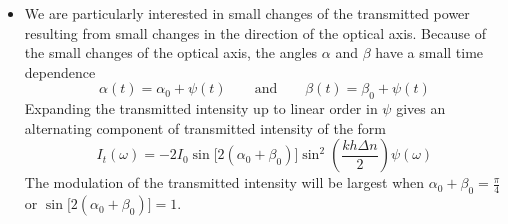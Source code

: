 \documentclass[11pt, a4paper]{article}
\newcommand{\eqtext}[1]{\qquad \text{#1} \qquad}
\begin{document}
\begin{itemize}
	\item We are particularly interested in small changes of the transmitted power resulting from small changes in the direction of the optical axis. Because of the small changes of the optical axis, the angles $ \alpha $ and $ \beta $ have a small time dependence
	\begin{equation*}
		\alpha(t) = \alpha_{0} + \psi(t) \eqtext{and} \beta(t) = \beta_{0} + \psi(t)
	\end{equation*}
	Expanding the transmitted intensity up to linear order in $ \psi $ gives an alternating component of transmitted intensity of the form
	\begin{equation*}
		I_{t}(\omega) = -2 I_{0} \sin\big[2(\alpha_{0} + \beta_{0})\big]\sin^{2}\left(\frac{kh\Delta n}{2}\right) \psi(\omega)
	\end{equation*}
	The modulation of the transmitted intensity will be largest when $ \alpha_{0} + \beta_{0} = \frac{\pi}{4}$ or $ \sin\big[2(\alpha_{0} + \beta_{0})\big] = 1$. 

\end{itemize}
\end{document}
